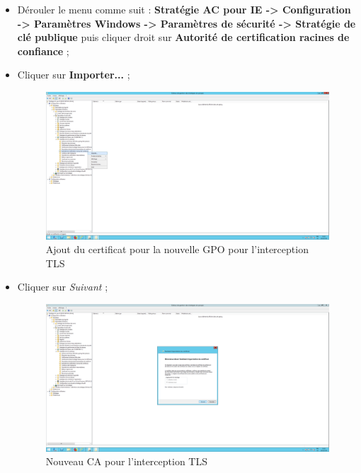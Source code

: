 \begin{itemize}
\item Dérouler le menu comme suit : \textbf{Stratégie AC pour IE -> Configuration -> Paramètres Windows -> Paramètres de sécurité -> Stratégie de clé publique} puis cliquer droit sur \textbf{Autorité de certification racines de confiance} ;
\item Cliquer sur \textbf{Importer...} ;
\begin{figure}[h!]
    \begin{center}
        \includegraphics[scale=0.20]{Interception_Screenshots/GPO4.png}
        \caption{Ajout du certificat pour la nouvelle GPO pour l'interception TLS}
    \end{center}
\end{figure}
\FloatBarrier 

\item Cliquer sur \textit{Suivant} ;
\begin{figure}[h!]
    \begin{center}
        \includegraphics[scale=0.20]{Interception_Screenshots/GPO5.png}
        \caption{Nouveau CA pour l'interception TLS}
    \end{center}
\end{figure}
\FloatBarrier 


\end{itemize}

